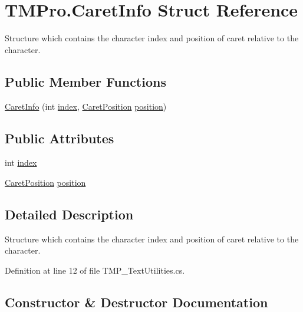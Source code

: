 \hypertarget{struct_t_m_pro_1_1_caret_info}{}\section{T\+M\+Pro.\+Caret\+Info Struct Reference}
\label{struct_t_m_pro_1_1_caret_info}


Structure which contains the character index and position of caret relative to the character.  


\subsection*{Public Member Functions}
\begin{DoxyCompactItemize}
\item 
\mbox{\hyperlink{struct_t_m_pro_1_1_caret_info_a6c349e4140e9613f10d32d5c8889b74f}{Caret\+Info}} (int \mbox{\hyperlink{struct_t_m_pro_1_1_caret_info_a5bee4920f331f386ab534fad1793ae0a}{index}}, \mbox{\hyperlink{namespace_t_m_pro_af5c53a4799a78487e0d1ab886f3c97bc}{Caret\+Position}} \mbox{\hyperlink{struct_t_m_pro_1_1_caret_info_a92907010a9999366a1695f923f0c469e}{position}})
\end{DoxyCompactItemize}
\subsection*{Public Attributes}
\begin{DoxyCompactItemize}
\item 
int \mbox{\hyperlink{struct_t_m_pro_1_1_caret_info_a5bee4920f331f386ab534fad1793ae0a}{index}}
\item 
\mbox{\hyperlink{namespace_t_m_pro_af5c53a4799a78487e0d1ab886f3c97bc}{Caret\+Position}} \mbox{\hyperlink{struct_t_m_pro_1_1_caret_info_a92907010a9999366a1695f923f0c469e}{position}}
\end{DoxyCompactItemize}


\subsection{Detailed Description}
Structure which contains the character index and position of caret relative to the character. 



Definition at line 12 of file T\+M\+P\+\_\+\+Text\+Utilities.\+cs.



\subsection{Constructor \& Destructor Documentation}
\mbox{\label{struct_t_m_pro_1_1_caret_info_a6c349e4140e9613f10d32d5c8889b74f}} 
